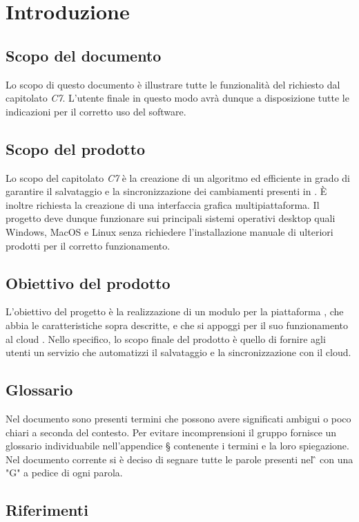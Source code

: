 \section{Introduzione}
\subsection{Scopo del documento}
Lo scopo di questo documento è illustrare tutte le funzionalità del  richiesto dal capitolato \textit{C7}. L'utente finale in questo modo avrà dunque a disposizione tutte le indicazioni per il corretto uso del software.

\subsection{Scopo del prodotto}
Lo scopo del capitolato \textit{C7} è la creazione di un algoritmo  ed efficiente in grado di garantire il salvataggio e la sincronizzazione dei cambiamenti presenti in . È inoltre richiesta la creazione di una interfaccia grafica multipiattaforma. Il progetto deve dunque funzionare sui principali sistemi operativi desktop quali Windows, MacOS e Linux senza richiedere l'installazione manuale di ulteriori prodotti per il corretto funzionamento. 
\subsection{Obiettivo del prodotto}
L'obiettivo del progetto è la realizzazione di un modulo per la piattaforma , che abbia le caratteristiche sopra descritte, e che si appoggi per il suo funzionamento al cloud .
Nello specifico, lo scopo finale del prodotto è quello di fornire agli utenti un servizio che automatizzi il salvataggio e la sincronizzazione con il cloud.

\subsection{Glossario}
Nel documento sono presenti termini che possono avere significati ambigui o poco chiari a seconda del contesto. Per evitare incomprensioni il gruppo fornisce un glossario individuabile nell'appendice \S{} contenente i termini e la loro spiegazione.\newline{}
Nel documento corrente si è deciso di segnare tutte le parole presenti nel \G{} con una "G" a pedice di ogni parola.
\subsection{Riferimenti}
